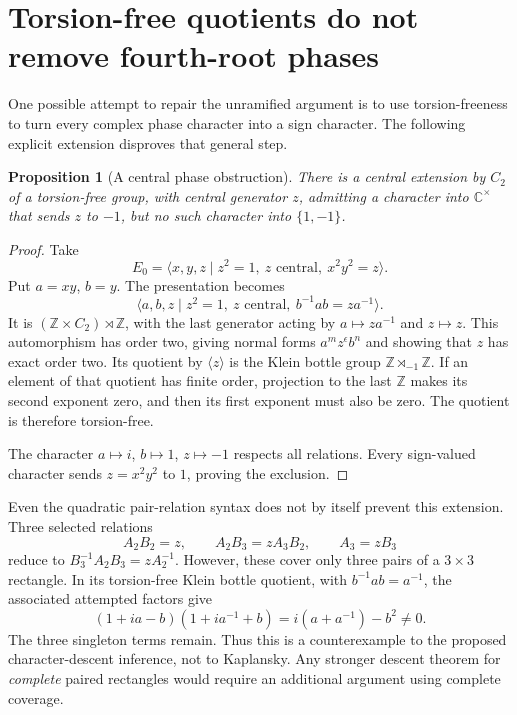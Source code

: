 \documentclass[11pt,a4paper,oneside]{report}
\newtheorem{proposition}[theorem]{Proposition}
\theoremstyle{definition}
\theoremstyle{remark}
\newcommand{\C}{\mathbb C}
\newcommand{\Z}{\mathbb Z}
\begin{document}
\section{Torsion-free quotients do not remove fourth-root phases}

One possible attempt to repair the unramified argument is to use
torsion-freeness to turn every complex phase character into a sign
character. The following explicit extension disproves that general step.

\begin{proposition}[A central phase obstruction]\label{M04:prop:extension}
There is a central extension by $C_2$ of a torsion-free group, with
central generator $z$, admitting a character into $\C^\times$ that
sends $z$ to $-1$, but no such character into $\{1,-1\}$.
\end{proposition}
\begin{proof}
Take
\[
E_0=\langle x,y,z\mid z^2=1,\ z\text{ central},\ x^2y^2=z\rangle.
\]
Put $a=xy$, $b=y$. The presentation becomes
\[
\langle a,b,z\mid z^2=1,\ z\text{ central},\ b^{-1}ab=za^{-1}\rangle.
\]
It is $(\Z\times C_2)\rtimes\Z$, with the last generator acting by
$a\mapsto za^{-1}$ and $z\mapsto z$. This automorphism has order two,
giving normal forms $a^mz^\epsilon b^n$ and showing that $z$ has
exact order two. Its quotient by $\langle z\rangle$ is the Klein
bottle group $\Z\rtimes_{-1}\Z$. If an element of that quotient has
finite order, projection to the last $\Z$ makes its second exponent
zero, and then its first exponent must also be zero. The quotient is
therefore torsion-free.

The character $a\mapsto i$, $b\mapsto1$, $z\mapsto-1$ respects all
relations. Every sign-valued character sends
$z=x^2y^2$ to $1$, proving the exclusion.
\end{proof}

Even the quadratic pair-relation syntax does not by itself prevent this
extension. Three selected relations
\[
A_2B_2=z,\qquad A_2B_3=zA_3B_2,\qquad A_3=zB_3
\]
reduce to $B_3^{-1}A_2B_3=zA_2^{-1}$. However, these cover only
three pairs of a $3\times3$ rectangle. In its torsion-free Klein bottle
quotient, with $b^{-1}ab=a^{-1}$, the associated attempted factors give
\[
(1+ia-b)(1+ia^{-1}+b)=i(a+a^{-1})-b^2\ne0.
\]
The three singleton terms remain. Thus this is a counterexample to
the proposed character-descent inference, not to Kaplansky. Any stronger
descent theorem for \emph{complete} paired rectangles would require an
additional argument using complete coverage.
\end{document}
